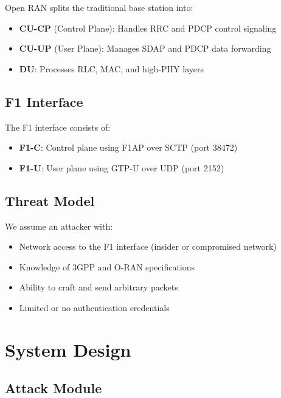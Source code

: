 \documentclass[conference]{IEEEtran}
\begin{document}
Open RAN splits the traditional base station into:
\begin{itemize}
    \item \textbf{CU-CP} (Control Plane): Handles RRC and PDCP control signaling
    \item \textbf{CU-UP} (User Plane): Manages SDAP and PDCP data forwarding
    \item \textbf{DU}: Processes RLC, MAC, and high-PHY layers
\end{itemize}

\subsection{F1 Interface}

The F1 interface \cite{3gpp-38.473} consists of:
\begin{itemize}
    \item \textbf{F1-C}: Control plane using F1AP over SCTP (port 38472)
    \item \textbf{F1-U}: User plane using GTP-U over UDP (port 2152)
\end{itemize}

\subsection{Threat Model}

We assume an attacker with:
\begin{itemize}
    \item Network access to the F1 interface (insider or compromised network)
    \item Knowledge of 3GPP and O-RAN specifications
    \item Ability to craft and send arbitrary packets
    \item Limited or no authentication credentials
\end{itemize}

\section{System Design}

\subsection{Attack Module}
\end{document}
